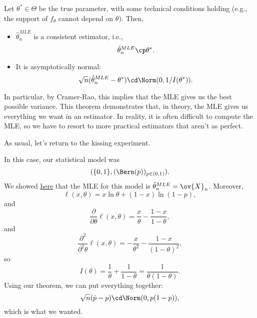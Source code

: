 \begin{theorem}

Let $\theta^*\in \Theta$ be the true parameter, with some technical conditions holding (e.g., the support of $f_{\theta}$ cannot depend on $\theta$). Then, 
\begin{itemize}
    \item $\hat{\theta}_n^{MLE}$ is a consistent estimator, i.e., 
    \[\hat{\theta}_n^{MLE}\cp \theta^*.\]
    \item It is asymptotically normal: 
    \[\sqrt{n}(\hat{\theta}_n^{MLE} - \theta^*)\cd \Norm(0, 1/I(\theta^*)).\]
\end{itemize}
\end{theorem}

In particular, by Cramer-Rao, this implies that the MLE gives us the best possible variance. This theorem demonstrates that, in theory, the MLE gives us everything we want in an estimator. In reality, it is often difficult to compute the MLE, so we have to resort to more practical estimators that aren't as perfect. 

\begin{example}
\exlabel

As usual, let's return to the kissing experiment.
\end{example}

In this case, our statistical model was
\[(\{0,1\}, (\Bern(p))_{p\in (0,1)}).\]
We showed \hyperlink{ex:mlebern}{here} that the MLE for this model is $\hat{\theta}_n^{MLE} = \ov{X}_n$. Moreover, 
\[\ell(x,\theta) = x\ln \theta + (1-x)\ln (1-p),\]
and
\[\frac{\partial}{\partial \theta}\ell(x,\theta) = \frac{x}{\theta} - \frac{1-x}{1-\theta},\]
and 
\[\frac{\partial^2}{\partial^2\theta}\ell(x,\theta) = -\frac{x}{\theta^2} - \frac{1-x}{(1-\theta)^2},\]
so
\[I(\theta) = \frac{1}{\theta}+\frac{1}{1-\theta} = \frac{1}{\theta(1-\theta)}.\]
Using our theorem, we can put everything together:
\[\sqrt{n}(\hat{p}-p)\cd \Norm(0,p(1-p)),\]
which is what we wanted. 
